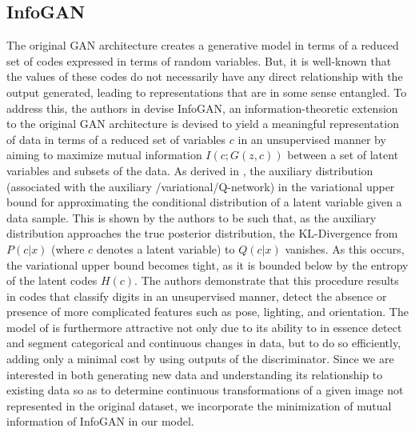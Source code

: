 \documentclass{article}
\begin{document}
\subsection{InfoGAN}\label{igan}
	The original GAN architecture creates a generative model in terms of a reduced set of codes expressed in terms of random variables.  But, it is well-known that the values of these codes do not necessarily have any direct relationship with the output generated, leading to representations that are in some sense entangled.  To address this, the authors in \cite{Chen2016InfoGAN:Nets} devise InfoGAN, an information-theoretic extension to the original GAN architecture is devised to yield a meaningful representation of data in terms of a reduced set of variables $c$ in an unsupervised manner by aiming to maximize mutual information $I(c;G(z,c))$ between a set of latent variables and subsets of the data.  As derived in \cite{Chen2016InfoGAN:Nets}, the auxiliary distribution (associated with the auxiliary /variational/Q-network) in the variational upper bound for approximating the conditional distribution of a latent variable given a data sample. This is shown by the authors to be such that, as the auxiliary distribution approaches the true posterior distribution, the KL-Divergence from $P(c|x)$ (where $c$ denotes a latent variable) to $Q(c|x)$ vanishes. As this occurs, the variational upper bound becomes tight, as it is bounded below by the entropy of the latent codes $H(c)$.
\newline
	The authors demonstrate that this procedure results in codes that classify digits in an unsupervised manner, detect the absence or presence of more complicated features such as pose, lighting, and orientation.  The model of %
 is furthermore attractive not only due to its ability to in essence detect and segment categorical and continuous changes in data, but to do so efficiently, adding only a minimal cost by using outputs of the discriminator.  Since we are interested in both generating new data and understanding its relationship to existing data so as to determine continuous transformations of a given image not represented in the original dataset, we incorporate the minimization of mutual information of InfoGAN in our model. 
\end{document}
